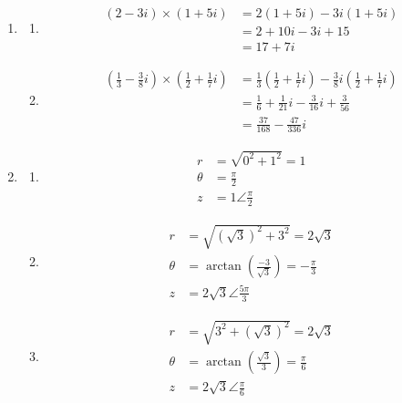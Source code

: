 \documentclass[a4paper]{article}
\begin{document}
	\begin{enumerate}
		\item
		\begin{enumerate}
			\item
			\begin{align*}
				(2-3i) \times (1 + 5i) &=  2(1 + 5i) - 3i(1 + 5i) \\
				&= 2 + 10i - 3i + 15 \\
				&= 17 + 7i
			\end{align*}
			
			\item
			\begin{align*}
				\left( \tfrac{1}{3} - \tfrac{3}{8}i \right) \times \left( \tfrac{1}{2} + \tfrac{1}{7}i \right) &=  \tfrac{1}{3} \left( \tfrac{1}{2} + \tfrac{1}{7}i \right) - \tfrac{3}{8}i \left( \tfrac{1}{2} + \tfrac{1}{7}i \right) \\
				&= \tfrac{1}{6} + \tfrac{1}{21}i - \tfrac{3}{16}i + \tfrac{3}{56} \\
				&= \tfrac{37}{168} - \tfrac{47}{336}i
			\end{align*}
		\end{enumerate}
		
		\item
		\begin{enumerate}
			\item 
			\begin{align*}
				r &= \sqrt{0^2 + 1^2} = 1 \\
				\theta &= \frac{\pi}{2} \\
				z &= 1 \angle \tfrac{\pi}{2}
			\end{align*}
			
			\item 
			\begin{align*}
				r &= \sqrt{(\sqrt{3})^2 + 3^2} = 2 \sqrt{3} \\
				\theta &= \arctan \left( \tfrac{-3}{\sqrt{3}} \right) = - \tfrac{\pi}{3} \\
				z &= 2 \sqrt{3} \angle \tfrac{5 \pi}{3}
			\end{align*}
			
			\item 
			\begin{align*}
				r &= \sqrt{3^2 + (\sqrt{3})^2} = 2 \sqrt{3} \\
				\theta &= \arctan \left( \tfrac{\sqrt{3}}{3} \right) = \tfrac{\pi}{6} \\
				z &= 2 \sqrt{3} \angle \tfrac{\pi}{6}
			\end{align*}
			

\end{enumerate}
\end{enumerate}
\end{document}
